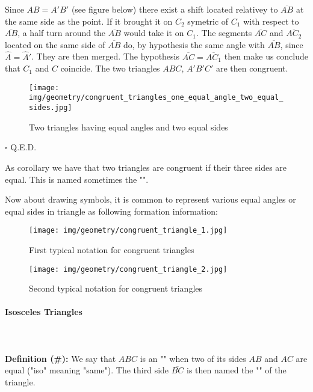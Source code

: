 \begin{enumerate}
\begin{dem}
		Since $AB = A'B'$ (see figure below) there exist a shift located relativey to $\overline{AB}$ at the same side as the point. If it brought it on $C_2$ symetric of $C_1$ with respect to $\overline{AB}$, a half turn around the $\overline{AB}$ would take it on $C_1$. The segments $\overline{AC}$ and $\overline{AC_2}$ located on the same side of $\overline{AB}$ do, by hypothesis the same angle with $\overline{AB}$, since $\hat{A}=\hat{A}'$. They are then merged. The hypothesis $\overline{AC}=\overline{AC_1}$ then make us conclude that $C_1$ and $C$ coincide. The two triangles $ABC$, $A'B'C'$ are then congruent.
		\begin{figure}[H]
			\centering
			\texttt{[image: img/geometry/congruent\_triangles\_one\_equal\_angle\_two\_equal\_sides.jpg]}
			\caption{Two triangles having equal angles and two equal sides}
		\end{figure}
		\begin{flushright}
			$\square$  Q.E.D.
		\end{flushright}
		\end{dem}
	\end{enumerate}
	\begin{corollary}
	As corollary we have that two triangles are congruent if their three sides are equal. This is named sometimes the "".
	\end{corollary}
	
	Now about drawing symbols, it is common to represent various equal angles or equal sides in triangle as following formation information:
	\begin{figure}[H]
		\centering
		\texttt{[image: img/geometry/congruent\_triangle\_1.jpg]}
		\caption{First typical notation for congruent triangles}
	\end{figure}
	\begin{figure}[H]
		\centering
		\texttt{[image: img/geometry/congruent\_triangle\_2.jpg]}
		\caption{Second typical notation for congruent triangles}
	\end{figure}
	
	\pagebreak
	\paragraph{Isosceles Triangles}\mbox{}\\\\
	\textbf{Definition (\#\mydef):} We say that $ABC$ is an "" when two of its sides $AB$ and $AC$ are equal ("iso" meaning "same"). The third side $\overline{BC}$ is then named the "" of the triangle.
	
